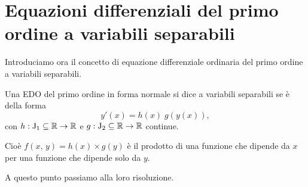 \documentclass[../../analisi2]{subfiles}
\begin{document}
    \chapter{Equazioni differenziali del primo ordine a variabili separabili}

        Introduciamo ora il concetto di equazione differenziale ordinaria del primo ordine a variabili separabili.

        \begin{definizione}
            Una EDO del primo ordine in forma normale si dice a variabili separabili se è della forma
            \[
                y'(x) = h(x) \; g(y(x)),
            \]
            con \(h : \mathrm{J}_1 \subseteq \mathbb{R} \to \mathbb{R}\) e \(g : \mathrm{J}_2 \subseteq \mathbb{R} \to \mathbb{R}\) continue.

            Cioè \(f(x, \, y) = h(x) \times g(y)\) è il prodotto di una funzione che dipende da \(x\) per una funzione che dipende solo
            da \(y\).
        \end{definizione}

        A questo punto passiamo alla loro risoluzione.
\end{document}
